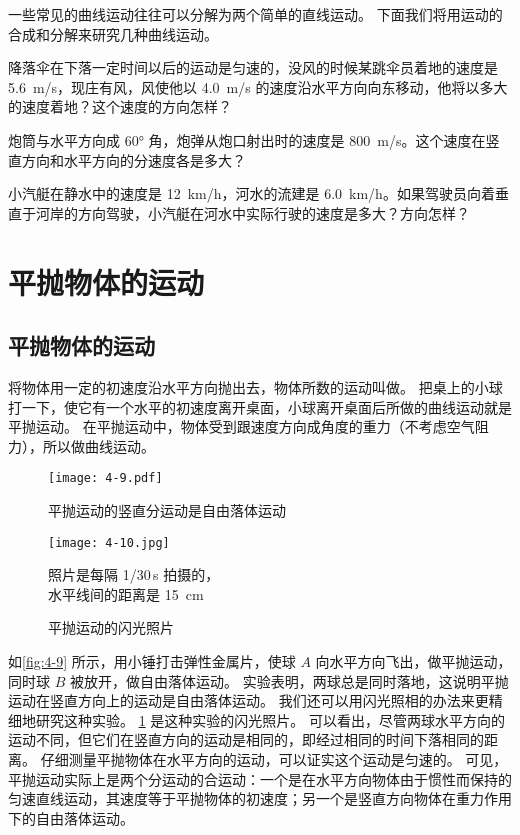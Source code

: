 一些常见的曲线运动往往可以分解为两个简单的直线运动。
下面我们将用运动的合成和分解来研究几种曲线运动。

\begin{Practice}
\begin{question}
  \item 降落伞在下落一定时间以后的运动是匀速的，没风的时候某跳伞员着地的速度是 \qty{5.6}{m/s}，现庄有风，风使他以 \qty{4.0}{m/s} 的速度沿水平方向向东移动，他将以多大的速度着地？这个速度的方向怎样？
  \item 炮筒与水平方向成 \ang{60} 角，炮弹从炮口射出时的速度是 \qty{800}{m/s}。这个速度在竖直方向和水平方向的分速度各是多大？
  \item 小汽艇在静水中的速度是 \qty{12}{km/h}，河水的流建是 \qty{6.0}{km/h}。如果驾驶员向着垂直于河岸的方向驾驶，小汽艇在河水中实际行驶的速度是多大？方向怎样？
\end{question}
\end{Practice}


\section{平抛物体的运动}
\subsection{平抛物体的运动} 
将物体用一定的初速度沿水平方向抛出去，物体所数的运动叫做。
把桌上的小球打一下，使它有一个水平的初速度离开桌面，小球离开桌面后所做的曲线运动就是平抛运动。
在平抛运动中，物体受到跟速度方向成角度的重力（不考虑空气阻力），所以做曲线运动。

\begin{figure}
  \begin{minipage}[b]{0.55\linewidth}\centering
    \texttt{[image: 4-9.pdf]}
    \caption{平抛运动的竖直分运动是自由落体运动}\label{fig:4-9}
  \end{minipage}%
  \begin{minipage}[b]{0.42\linewidth}\centering
    \texttt{[image: 4-10.jpg]}\par
    \footnotesize 照片是每隔 1/30\,\unit{s} 拍摄的，\\水平线间的距离是 \qty{15}{cm}
    \caption{平抛运动的闪光照片}\label{fig:4-10}
  \end{minipage}
\end{figure}

如\cref{fig:4-9} 所示，用小锤打击弹性金属片，使球 $A$ 向水平方向飞出，做平抛运动，同时球 $B$ 被放开，做自由落体运动。
实验表明，两球总是同时落地，这说明平抛运动在竖直方向上的运动是自由落体运动。
我们还可以用闪光照相的办法来更精细地研究这种实验。
\cref{fig:4-10} 是这种实验的闪光照片。
可以看出，尽管两球水平方向的运动不同，但它们在竖直方向的运动是相同的，即经过相同的时间下落相同的距离。
仔细测量平抛物体在水平方向的运动，可以证实这个运动是匀速的。
可见，平抛运动实际上是两个分运动的合运动：一个是在水平方向物体由于惯性而保持的匀速直线运动，其速度等于平抛物体的初速度；另一个是竖直方向物体在重力作用下的自由落体运动。

